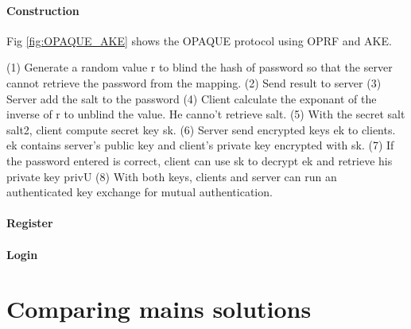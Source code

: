 \documentclass[../report.tex]{subfiles}
\begin{document}
\paragraph{Construction}

Fig \ref{fig:OPAQUE_AKE} shows the OPAQUE protocol using OPRF and AKE.

(1) Generate a random value r to blind the hash of password so that the server cannot retrieve the password from the mapping.
(2) Send result to server
(3) Server add the salt to the password
(4) Client calculate the exponant of the inverse of r to unblind the value. He canno't retrieve salt.
(5) With the secret salt salt2, client compute secret key sk.
(6) Server send encrypted keys ek to clients. ek contains server's public key and client's private key encrypted with sk.
(7) If the password entered is correct, client can use sk to decrypt ek and retrieve his private key privU
(8) With both keys, clients and server can run an authenticated key exchange for mutual authentication.


\paragraph{Register}

\paragraph{Login}


\section{Comparing mains solutions}
\end{document}
